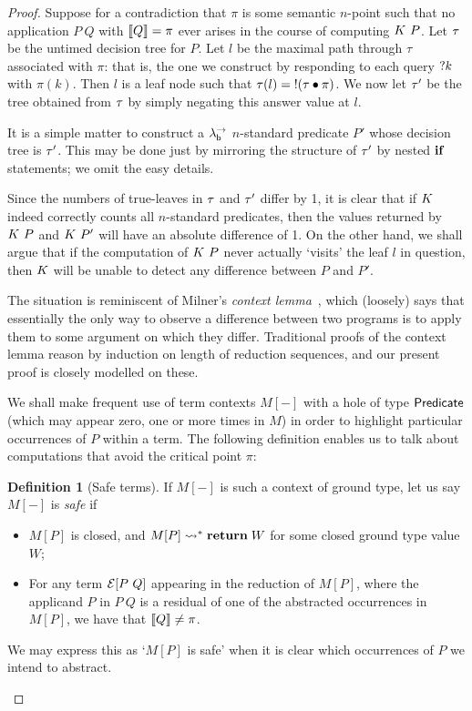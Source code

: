 \documentclass[12pt,phd,lfcs,twoside,openright,logo,leftchapter,normalheadings]{infthesis}
\theoremstyle{plain}
\theoremstyle{definition}
\newtheorem{definition}[theorem]{Definition}
\begin{document}
\begin{proof}
  Suppose for a contradiction that $\pi$ is some semantic $n$-point
  such that no application $P~Q$ with $\llbracket Q \rrbracket =\pi$ ever arises in the
  course of computing $K~P$. Let $\tau$ be the untimed
  decision tree for $P$. Let $l$ be the maximal path through $\tau$
  associated with $\pi$: that is, the one we construct by responding
  to each query $\mathord{?} k$ with $\pi(k)$. Then $l$ is a leaf node such
  that $\tau(l) = \mathord{!} (\tau \bullet \pi)$. We now let $\tau'$ be
  the tree obtained from $\tau$ by simply negating this answer value
  at $l$.

  It is a simple matter to construct a $\lambda^\rightarrow_{\mathsf{b}}$ $n$-standard predicate
  $P'$ whose decision tree is $\tau'$. This may be done just by
  mirroring the structure of $\tau'$ by nested $\mathbf{if}$ statements; we
  omit the easy details.

  Since the numbers of true-leaves in $\tau$ and $\tau'$ differ by
  1, it is clear that if $K$ indeed correctly counts all
  $n$-standard predicates, then the values returned by $K~P$
  and $K~P'$ will have an absolute difference of 1.  On the
  other hand, we shall argue that if the computation of $K~P$
  never actually `visits' the leaf $l$ in question, then $K$
  will be unable to detect any difference between $P$ and $P'$.

  The situation is reminiscent of Milner's \emph{context
    lemma}~\cite{Milner77}, which (loosely) says that essentially the
  only way to observe a difference between two programs is to apply
  them to some argument on which they differ.  Traditional proofs of
  the context lemma reason by induction on length of reduction
  sequences, and our present proof is closely modelled on these.

  We shall make frequent use of term contexts $M[-]$ with a hole of
  type $\mathsf{Predicate}$ (which may appear zero, one or more times in $M$)
  in order to highlight particular occurrences of $P$ within a term.
  The following definition enables us to talk about computations that
  avoid the critical point $\pi$:

  \begin{definition}[Safe terms]\label{def:safe}
  If $M[-]$ is such a context of ground type, let us say $M[-]$ is \emph{safe} if
  \begin{itemize}
    \item $M[P]$ is closed, and $M[P] \leadsto^\ast \mathbf{return}\;W$ for some closed
    ground type value $W$;
    \item For any term $\mathcal{E}[P~Q]$ appearing in the reduction of $M[P]$, where the
    applicand $P$ in $P~Q$ is a residual of one of the abstracted occurrences in $M[P]$,
    we have that $\llbracket Q \rrbracket \neq \pi$.
  \end{itemize}
  We may express this as `$M[P]$ is safe' when it is clear which occurrences of $P$
  we intend to abstract.
  \end{definition}


\end{proof}
\end{document}
